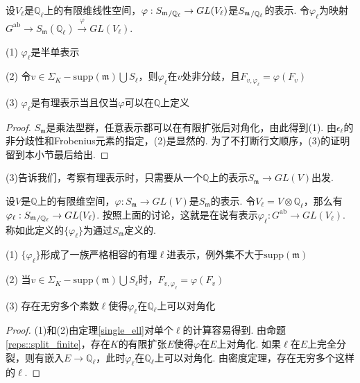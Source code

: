 设$V_{\ell}$是$\mathbb{Q}_{\ell}$上的有限维线性空间，$\varphi: {S_{\mathfrak{m}}}_{/\mathbb{Q}_{\ell}} \to GL(V_{\ell})$是${S_{\mathfrak{m}}}_{/\mathbb{Q}_{\ell}}$的表示. 令$\varphi_{\ell}$为映射$G^{\mathrm{ab}}\to S_{\mathfrak{m}}(\mathbb{Q}_{\ell})\xrightarrow{\varphi} GL(V_{\ell})$.

\begin{cthm}
    (1) $\varphi_{\ell}$是半单表示

    (2) 令$v\in \Sigma_K - \mathrm{supp}(\mathfrak{m})\bigcup S_{\ell}$，则$\varphi_{\ell}$在$v$处非分歧，且$F_{v, \varphi_{\ell}} = \varphi(F_v)$

    (3) $\varphi_{\ell}$是有理表示当且仅当$\varphi$可以在$\mathbb{Q}$上定义 \label{single_ell}
\end{cthm}

\begin{proof}
    $S_{\mathfrak{m}}$是乘法型群，任意表示都可以在有限扩张后对角化，由此得到(1). 由$\epsilon_{\ell}$的非分歧性和Frobenius元素的指定，(2)是显然的.
    为了不打断行文顺序，(3)的证明留到本小节最后给出.
\end{proof}

(3)告诉我们，考察有理表示时，只需要从一个$\mathbb{Q}$上的表示$S_{\mathfrak{m}}\to GL(V)$出发.

设$V$是$\mathbb{Q}$上的有限维空间，$\varphi: S_{\mathfrak{m}}\to GL(V)$是$S_{\mathfrak{m}}$的表示. 令$V_{\ell} = V\otimes \mathbb{Q}_{\ell}$，那么有$\varphi_{\ell}: {S_{\mathfrak{m}}}_{/\mathbb{Q}_{\ell}}\to GL(V_{\ell})$. 按照上面的讨论，这就是在说有表示$\varphi_{\ell}: G^{\mathrm{ab}}\to GL(V_{\ell})$. 称如此定义的$\{\varphi_{\ell}\}$为通过$S_{\mathfrak{m}}$定义的.

\begin{cthm}
    (1) $\{\varphi_{\ell}\}$形成了一族严格相容的有理$\ell$进表示，例外集不大于$\mathrm{supp}(\mathfrak{m})$

    (2) 当$v\in \Sigma_K - \mathrm{supp}(\mathfrak{m})\bigcup S_{\ell}$时，$F_{v, \varphi_{\ell}} = \varphi(F_v)$

    (3) 存在无穷多个素数$\ell$使得$\varphi_{\ell}$在$\mathbb{Q}_{\ell}$上可以对角化
\end{cthm}

\begin{proof}
    (1)和(2)由定理\ref{single_ell}对单个$\ell$的计算容易得到. 由命题\ref{reps::split_finite}，存在$K$的有限扩张$E$使得$\varphi$在$E$上对角化. 如果$\ell$在$E$上完全分裂，则有嵌入$E\to \mathbb{Q}_{\ell}$，此时$\varphi_{\ell}$在$\mathbb{Q}_{\ell}$上可以对角化. 由\Chebotarev 密度定理，存在无穷多个这样的$\ell$.
\end{proof}

